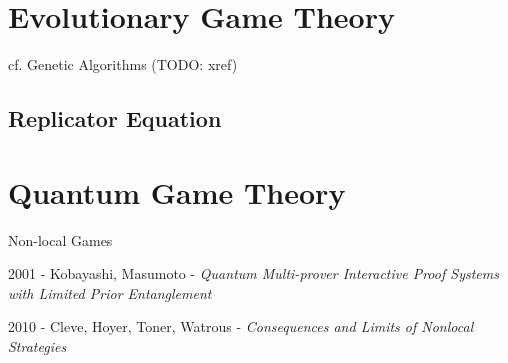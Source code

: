 \section{Evolutionary Game Theory}\label{sec:evolutionary_game_theory}

cf. Genetic Algorithms (TODO: xref)



\subsection{Replicator Equation}\label{sec:replicator_equation}



\section{Quantum Game Theory}\label{sec:quantum_game_theory}

Non-local Games

2001 - Kobayashi, Masumoto - \emph{Quantum Multi-prover Interactive Proof
  Systems with Limited Prior Entanglement}

2010 - Cleve, Hoyer, Toner, Watrous -
\emph{Consequences and Limits of Nonlocal Strategies}

